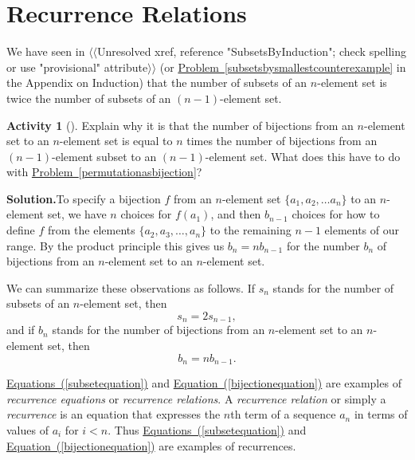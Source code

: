 \documentclass[10pt,]{book}
\theoremstyle{plain}
\theoremstyle{definition}
\newtheorem{activity}[project]{Activity}
\numberwithin{equation}{chapter}
\newcommand{\lt}{<}
\begin{document}
\section[{Recurrence Relations}]{Recurrence Relations}\label{sec_induction-recurrence}
\typeout{************************************************}
\typeout{************************************************}
We have seen in {$\langle\langle$Unresolved xref, reference "SubsetsByInduction"; check spelling or use "provisional" attribute$\rangle\rangle$} (or \hyperref[subsetsbysmallestcounterexample]{Problem~\ref{subsetsbysmallestcounterexample}} in the Appendix on Induction) that the number of subsets of an \(n\)-element set is twice the number of subsets of an \((n-1)\)-element set.%
\begin{activity}[]\label{activity-83}
Explain why it is that the number of bijections from an \(n\)-element set to an \(n\)-element set is equal to \(n\) times the number of bijections from an \((n-1)\)-element subset to an \((n-1)\)-element set. What does this have to do with \hyperref[permutationasbijection]{Problem~\ref{permutationasbijection}}?%
\par\medskip\noindent%
\textbf{Solution.}\quad To specify a bijection \(f\) from an \(n\)-element set \(\{a_1,a_2,
\ldots a_n\}\) to an \(n\)-element set, we have \(n\) choices for \(f(a_1)\), and then \(b_{n-1}\) choices for how to define \(f\) from the elements \(\{a_2,a_3, \ldots,a_n\}\) to the remaining \(n-1\) elements of our range. By the product principle this gives us \(b_n=nb_{n-1}\) for the number \(b_n\) of bijections from an \(n\)-element set to an \(n\)-element set.%
\end{activity}
We can summarize these observations as follows. If \(s_n\) stands for the number of subsets of an \(n\)-element set, then%
\begin{equation}
s_n =2s_{n-1},\label{subsetequation}
\end{equation}
and if \(b_n\) stands for the number of bijections from an \(n\)-element set to an \(n\)-element set, then%
\begin{equation}
b_n =
nb_{n-1}.\label{bijectionequation}
\end{equation}
%
\par
\hyperref[subsetequation]{Equations~(\ref{subsetequation})} and \hyperref[bijectionequation]{Equation~(\ref{bijectionequation})} are examples of \emph{recurrence equations} or \emph{recurrence relations}. A \emph{recurrence relation} or simply a \emph{recurrence} is an equation that expresses the \(n\)th term of a sequence \(a_n\) in terms of values of \(a_i\) for \(i\lt n\). Thus \hyperref[subsetequation]{Equations~(\ref{subsetequation})} and \hyperref[bijectionequation]{Equation~(\ref{bijectionequation})} are examples of recurrences.%
\typeout{************************************************}
\typeout{************************************************}
\end{document}
